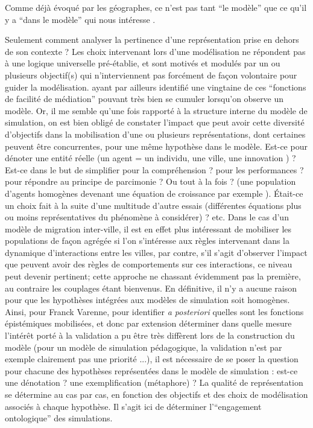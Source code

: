 Comme déjà évoqué par les géographes, ce n'est pas tant \enquote{le modèle} que ce qu'il y a \enquote{dans le modèle} qui nous intéresse \autocites{Sanders2000, Besse2000}.

Seulement comment analyser la pertinence d'une représentation prise en dehors de son contexte ? Les choix intervenant lors d'une modélisation ne répondent pas à une logique universelle pré-établie, et sont motivés et modulés par un ou plusieurs objectif(s) qui n’interviennent pas forcément de façon volontaire pour guider la modélisation. \textcite{Varenne2013b} ayant par ailleurs identifié une vingtaine de ces \enquote{fonctions de facilité de médiation} pouvant très bien se cumuler lorsqu’on observe un modèle. Or, il me semble qu'une fois rapporté à la structure interne du modèle de simulation, on est bien obligé de constater l'impact que peut avoir cette diversité d'objectifs dans la mobilisation d’une ou plusieurs représentations, dont certaines peuvent être concurrentes, pour une même hypothèse dans le modèle. Est-ce pour dénoter une entité réelle (un agent = un individu, une ville, une innovation ) ? Est-ce dans le but de simplifier pour la compréhension ? pour les performances ? pour répondre au principe de parcimonie ? Ou tout à la fois ? (une population d'agents homogènes devenant une équation de croissance par exemple ). Était-ce un choix fait à la suite d’une multitude d'autre essais (différentes équations plus ou moins représentatives du phénomène à considérer) ? etc. Dans le cas d'un modèle de migration inter-ville, il est en effet plus intéressant de mobiliser les populations de façon agrégée si l'on s'intéresse aux règles intervenant dans la dynamique d'interactions entre les villes, par contre, s'il s'agit d'observer l'impact que peuvent avoir des règles de comportements sur ces interactions, ce niveau peut devenir pertinent; cette approche ne chassant évidemment pas la première, au contraire les couplages étant bienvenus. En définitive, il n'y a aucune raison pour que les hypothèses intégrées aux modèles de simulation soit homogènes. Ainsi, pour Franck Varenne, pour identifier \textit{a posteriori} quelles sont les fonctions épistémiques mobilisées, et donc par extension déterminer dans quelle mesure l'intérêt porté à la validation a pu être très diffèrent lors de la construction du modèle (pour un modèle de simulation pédagogique, la validation n’est par exemple clairement pas une priorité ...), il est nécessaire de se poser la question pour chacune des hypothèses représentées dans le modèle de simulation : est-ce une dénotation ? une exemplification (métaphore) ? La qualité de représentation se détermine au cas par cas, en fonction des objectifs et des choix de modélisation associés à chaque hypothèse. Il s'agit ici de déterminer l'\enquote{engagement ontologique} des simulations.

